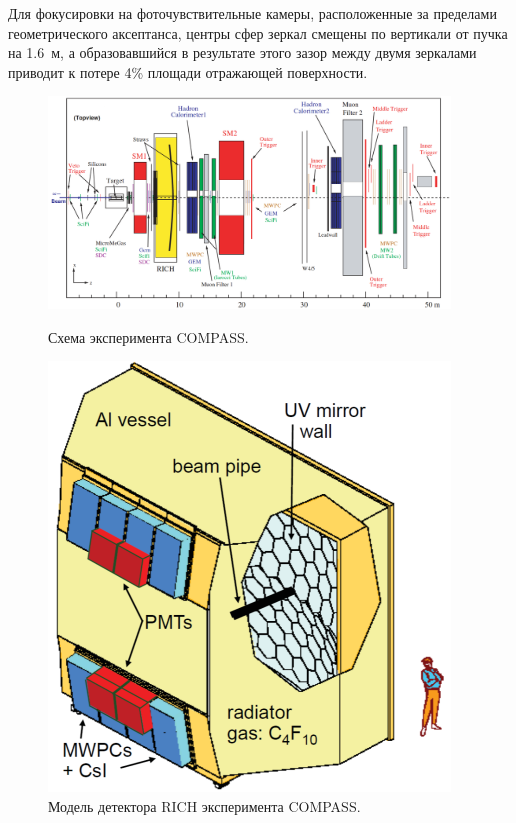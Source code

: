 Для фокусировки на фоточувствительные камеры, расположенные за пределами геометрического аксептанса, центры сфер зеркал смещены по вертикали от пучка на 1.6~м, а образовавшийся в результате этого зазор между двумя зеркалами приводит к потере 4\% площади отражающей поверхности.


\begin{figure}[H]
\begin{minipage}[b]{0.69\textwidth}
\includegraphics[width=0.95\textwidth]{pictures/COMPASS.png}
\caption{Схема эксперимента COMPASS.}
\label{fig:Compass}
\end{minipage}
\hspace{0.01\textwidth}
\begin{minipage}[b]{0.29\textwidth}
\includegraphics[width=0.95\textwidth]{pictures/COMPASS_RICH.png}
\caption{Модель детектора RICH эксперимента COMPASS.}
\label{fig:CompassRich}
\end{minipage}
\end{figure}

